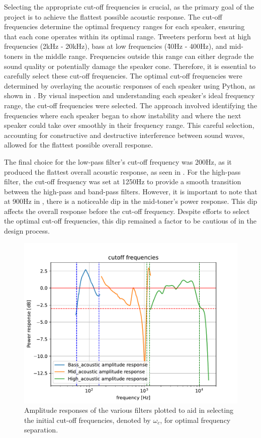 Selecting the appropriate cut-off frequencies is crucial, as the primary goal of the project is to achieve the flattest possible acoustic response. The cut-off frequencies determine the optimal frequency ranges for each speaker, ensuring that each cone operates within its optimal range. Tweeters perform best at high frequencies (2kHz - 20kHz), bass at low frequencies (\~40Hz - 400Hz), and mid-toners in the middle range. Frequencies outside this range can either degrade the sound quality or potentially damage the speaker cone. Therefore, it is essential to carefully select these cut-off frequencies.
The optimal cut-off frequencies were determined by overlaying the acoustic responses of each speaker using Python, as shown in . By visual inspection and understanding each speaker's ideal frequency range, the cut-off frequencies were selected. The approach involved identifying the frequencies where each speaker began to show instability and where the next speaker could take over smoothly in their frequency range. This careful selection, accounting for constructive and destructive interference between sound waves, allowed for the flattest possible overall response.

The final choice for the low-pass filter's cut-off frequency was 200Hz, as it produced the flattest overall acoustic response, as seen in . For the high-pass filter, the cut-off frequency was set at 1250Hz to provide a smooth transition between the high-pass and band-pass filters. However, it is important to note that at 900Hz in , there is a noticeable dip in the mid-toner's power response. This dip affects the overall response before the cut-off frequency. Despite efforts to select the optimal cut-off frequencies, this dip remained a factor to be cautious of in the design process.
\begin{figure}[H]
    \centering
    \includegraphics[width=0.65\linewidth]{TU Delft Booming Bass Project Report/figures/FilterGroup/chosenvalues.pdf}
    \captionsetup{justification=raggedright, labelfont=bf}
    \caption{Amplitude responses of the various filters plotted to aid in selecting the initial cut-off frequencies, denoted by $\omega_c$, for optimal frequency separation.}
    \label{fig: Cutoff frequencies}
\end{figure}

